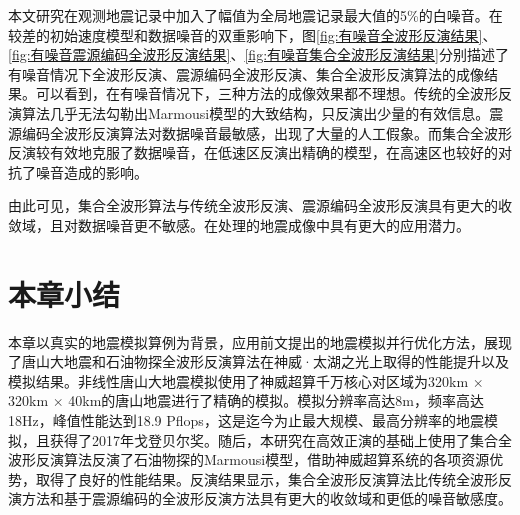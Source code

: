 本文研究在观测地震记录中加入了幅值为全局地震记录最大值的5\%的白噪音。在较差的初始速度模型和数据噪音的双重影响下，图\ref{fig:有噪音全波形反演结果}、\ref{fig:有噪音震源编码全波形反演结果}、\ref{fig:有噪音集合全波形反演结果}分别描述了有噪音情况下全波形反演、震源编码全波形反演、集合全波形反演算法的成像结果。可以看到，在有噪音情况下，三种方法的成像效果都不理想。传统的全波形反演算法几乎无法勾勒出Marmousi模型的大致结构，只反演出少量的有效信息。震源编码全波形反演算法对数据噪音最敏感，出现了大量的人工假象。而集合全波形反演较有效地克服了数据噪音，在低速区反演出精确的模型，在高速区也较好的对抗了噪音造成的影响。

由此可见，集合全波形算法与传统全波形反演、震源编码全波形反演具有更大的收敛域，且对数据噪音更不敏感。在处理的地震成像中具有更大的应用潜力。

\section{本章小结}

本章以真实的地震模拟算例为背景，应用前文提出的地震模拟并行优化方法，展现了唐山大地震和石油物探全波形反演算法在神威·太湖之光上取得的性能提升以及模拟结果。非线性唐山大地震模拟使用了神威超算千万核心对区域为320km $\times$ 320km $\times$ 40km的唐山地震进行了精确的模拟。模拟分辨率高达8m，频率高达18Hz，峰值性能达到18.9 Pflops，这是迄今为止最大规模、最高分辨率的地震模拟，且获得了2017年戈登贝尔奖。随后，本研究在高效正演的基础上使用了集合全波形反演算法反演了石油物探的Marmousi模型，借助神威超算系统的各项资源优势，取得了良好的性能结果。反演结果显示，集合全波形反演算法比传统全波形反演方法和基于震源编码的全波形反演方法具有更大的收敛域和更低的噪音敏感度。
